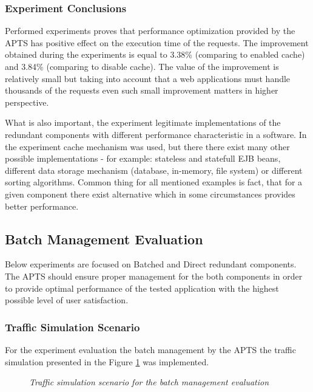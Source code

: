 \documentclass[10pt,a4paper]{article}
\begin{document}
\subsubsection{Experiment Conclusions} 


Performed experiments proves that performance optimization provided by the APTS has positive effect on the execution time of the requests. The improvement obtained during the experiments is equal to 3.38\% (comparing to enabled cache) and 3.84\% (comparing to disable cache). The value of the improvement is relatively small but taking into account that a web applications must handle thousands of the requests even such small improvement matters in higher perspective.  

What is also important, the experiment legitimate implementations of the redundant components with different performance characteristic in a software. In the experiment cache mechanism was used, but there there exist many other possible implementations - for example: stateless and statefull EJB beans, different data storage mechanism (database, in-memory, file system) or different sorting algorithms. Common thing for all mentioned examples is fact, that for a given component there exist alternative which in some circumstances provides better performance.     

 

\subsection{Batch Management Evaluation}

Below experiments  are focused on Batched and Direct redundant components. The APTS should ensure proper management for the both components in order to provide optimal performance of the tested application with the highest possible level of user satisfaction.  

\subsubsection{Traffic Simulation Scenario} \label{batchsimulationscenario}

For the experiment evaluation the batch management by the APTS the traffic simulation presented in the Figure \ref{trafficbatch} was implemented.

\begin{figure}[!htb]
\caption{\textit{Traffic simulation scenario for the batch management evaluation}} \label{trafficbatch}
\end{figure}
\end{document}

